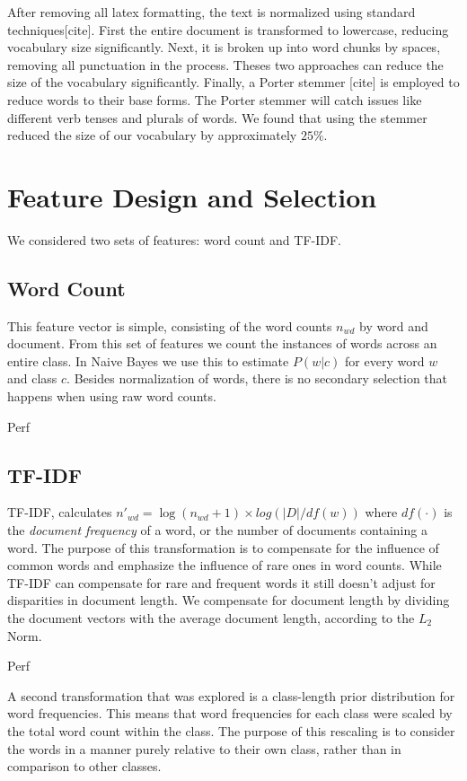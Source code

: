 \documentclass[10pt,twocolumn]{article}
\begin{document}
After removing all latex formatting, the text is normalized using standard techniques[cite]. First the entire document is transformed to lowercase, reducing vocabulary size significantly. Next, it is broken up into word chunks by spaces, removing all punctuation in the process. Theses two approaches can reduce the size of the vocabulary significantly. Finally, a Porter stemmer [cite] is employed to reduce words to their base forms. The Porter stemmer will catch issues like different verb tenses and plurals of words. We found that using the stemmer reduced the size of our vocabulary by approximately $25\%$. 

\section*{Feature Design and Selection}

We considered two sets of features: word count and TF-IDF. 

\subsection*{Word Count}

This feature vector is simple, consisting of the word counts $n_{wd}$ by word and document. From this set of features we count the instances of words across an entire class. In Naive Bayes we use this to estimate $P(w | c)$ for every word $w$ and class $c$. Besides normalization of words, there is no secondary selection that happens when using raw word counts. 

Perf

\subsection*{TF-IDF}

TF-IDF, calculates $n'_{wd} = \log (n_{wd} + 1) \times log (|D| / df(w))$ where $df(\cdot)$ is the \emph{document frequency} of a word, or the number of documents containing a word. The purpose of this transformation is to compensate for the influence of common words and emphasize the influence of rare ones in word counts. While TF-IDF can compensate for rare and frequent words it still doesn't adjust for disparities in document length. We compensate for document length by dividing the document vectors with the average document length, according to the $L_2$ Norm.

Perf

A second transformation that was explored is a class-length prior distribution for word frequencies. This means that word frequencies for each class were scaled by the total word count within the class. The purpose of this rescaling is to consider the words in a manner purely relative to their own class, rather than in comparison to other classes.
\end{document}
